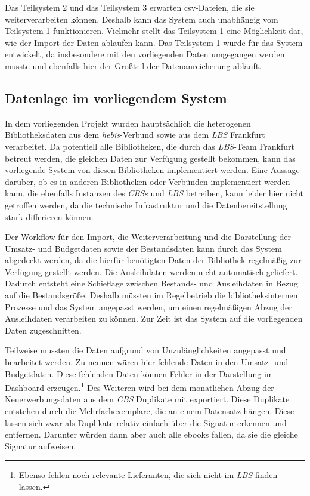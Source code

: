 Das Teilsystem 2 und das Teilsystem 3 erwarten csv-Dateien, die sie weiterverarbeiten können. 
Deshalb kann das System auch unabhängig vom Teilsystem 1 funktionieren. 
Vielmehr stellt das Teilsystem 1 eine Möglichkeit dar, wie der Import der Daten ablaufen kann. 
Das Teilsystem 1 wurde für das System entwickelt, da insbesondere mit den vorliegenden Daten umgegangen werden musste und ebenfalls hier 
der Großteil der Datenanreicherung abläuft.


\subsection{Datenlage im vorliegendem System}
In dem vorliegenden Projekt wurden hauptsächlich die heterogenen Bibliotheksdaten aus dem \textit{\acrshort{hebis}}-Verbund sowie aus dem \textit{\acrlong{LBS}} Frankfurt verarbeitet.
Da potentiell alle Bibliotheken, die durch das \textit{\acrshort{LBS}}-Team Frankfurt betreut werden, die gleichen Daten zur Verfügung gestellt bekommen,
kann das vorliegende  System von diesen Bibliotheken implementiert werden. Eine Aussage darüber, ob es in anderen Bibliotheken oder Verbünden implementiert werden kann, die ebenfalls
Instanzen des \textit{\acrlong{CBS}s} und \textit{\acrshort{LBS}} betreiben, kann leider hier nicht getroffen werden, da die technische Infrastruktur
und die Datenbereitstellung stark differieren können. 

Der Workflow für den Import, die Weiterverarbeitung und die Darstellung der Umsatz- und Budgetdaten sowie der Bestandsdaten kann durch das System
abgedeckt werden, da die hierfür benötigten Daten der Bibliothek regelmäßig zur Verfügung gestellt werden. Die Ausleihdaten werden nicht automatisch
geliefert. Dadurch entsteht eine Schieflage zwischen Bestands- und Ausleihdaten in Bezug auf die Bestandsgröße.
Deshalb müssten im Regelbetrieb die bibliotheksinternen Prozesse und das System angepasst werden, um einen regelmäßigen Abzug der Ausleihdaten
verarbeiten zu können. Zur Zeit ist das System auf die vorliegenden Daten zugeschnitten.

Teilweise mussten die Daten aufgrund von Unzulänglichkeiten angepasst und bearbeitet werden.
Zu nennen wären hier fehlende Daten in den Umsatz- und Budgetdaten. Diese fehlenden Daten können Fehler in der Darstellung im Dashboard erzeugen.\footnote{Ebenso fehlen noch relevante Lieferanten, die sich nicht im \textit{\acrshort{LBS}} finden lassen.}
Des Weiteren wird bei dem monatlichen Abzug der Neuerwerbungsdaten aus dem \textit{\acrshort{CBS}} Duplikate mit exportiert. Diese Duplikate entstehen durch
die Mehrfachexemplare, die an einem Datensatz hängen. Diese lassen sich zwar als Duplikate relativ einfach über die Signatur erkennen und entfernen.
Darunter würden dann aber auch alle ebooks fallen, da sie die gleiche Signatur aufweisen.

